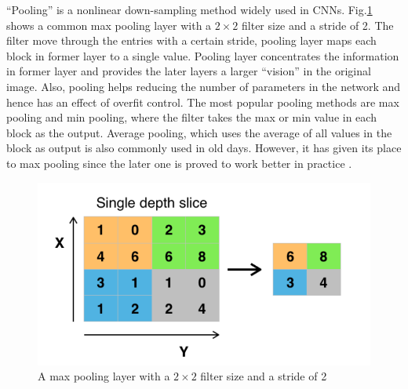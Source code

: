 \enquote{Pooling} is a nonlinear down-sampling method widely used in CNNs. Fig.\ref{fig:pool} shows a common max pooling layer with a $2 \times 2$ filter size and a stride of 2. The filter move through the entries with a certain stride, pooling layer maps each block in former layer to a single value. Pooling layer concentrates the information in former layer and provides the later layers a larger \enquote{vision} in the original image. Also, pooling helps reducing the number of parameters in the network and hence has an effect of overfit control. The most popular pooling methods are max pooling and min pooling, where the filter takes the max or min value in each block as the output. Average pooling, which uses the average of all values in the block as output is also commonly used in old days. However, it has given its place to max pooling since the later one is proved to work better in practice \cite{Scherer2010}.

\begin{figure}[H]
  \centering
  \includegraphics[width=\linewidth]{figures/pooling.png}
  \caption{A max pooling layer with a $2 \times 2$ filter size and a stride of 2}
  \label{fig:pool}
\end{figure}